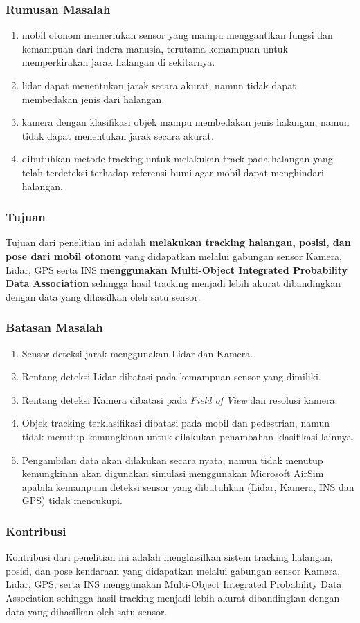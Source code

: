 \begin{frame}
    \frametitle{Rumusan Masalah}
    \begin{enumerate}
        \item mobil otonom memerlukan sensor yang mampu menggantikan fungsi dan kemampuan dari indera manusia, terutama kemampuan untuk memperkirakan jarak halangan di sekitarnya.
        \item lidar dapat menentukan jarak secara akurat, namun tidak dapat membedakan jenis dari halangan.
        \item kamera dengan klasifikasi objek mampu membedakan jenis halangan, namun tidak dapat menentukan jarak secara akurat.
        \item dibutuhkan metode tracking untuk melakukan track pada halangan yang telah terdeteksi terhadap referensi bumi agar mobil dapat menghindari halangan.
    \end{enumerate}
\end{frame}


\begin{frame}
    \frametitle{Tujuan}
    \justifying
    Tujuan dari penelitian ini adalah \textbf{melakukan tracking halangan, posisi, dan pose dari mobil otonom} yang didapatkan melalui gabungan sensor Kamera, Lidar, GPS serta INS \textbf{menggunakan Multi-Object Integrated Probability Data Association} sehingga hasil tracking menjadi lebih akurat dibandingkan dengan data yang dihasilkan oleh satu sensor.
\end{frame}


\begin{frame}
    \frametitle{Batasan Masalah}
    \justifying
    \begin{enumerate}
        \justifying
        \item Sensor deteksi jarak menggunakan Lidar dan Kamera.
        \item Rentang deteksi Lidar dibatasi pada kemampuan sensor yang dimiliki.
        \item Rentang deteksi Kamera dibatasi pada \textit{Field of View} dan resolusi kamera.
        \item Objek tracking terklasifikasi dibatasi pada mobil dan pedestrian, namun tidak menutup kemungkinan untuk dilakukan penambahan klasifikasi lainnya.
        \item Pengambilan data akan dilakukan secara nyata, namun tidak menutup kemungkinan akan digunakan simulasi menggunakan Microsoft AirSim apabila kemampuan deteksi sensor yang dibutuhkan (Lidar, Kamera, INS dan GPS) tidak mencukupi.
    \end{enumerate}
\end{frame}


\begin{frame}
    \frametitle{Kontribusi}

    \justifying
    Kontribusi dari penelitian ini adalah menghasilkan sistem tracking halangan, posisi, dan pose kendaraan yang didapatkan melalui gabungan sensor Kamera, Lidar, GPS, serta INS menggunakan Multi-Object Integrated Probability Data Association sehingga hasil tracking menjadi lebih akurat dibandingkan dengan data yang dihasilkan oleh satu sensor.

\end{frame}